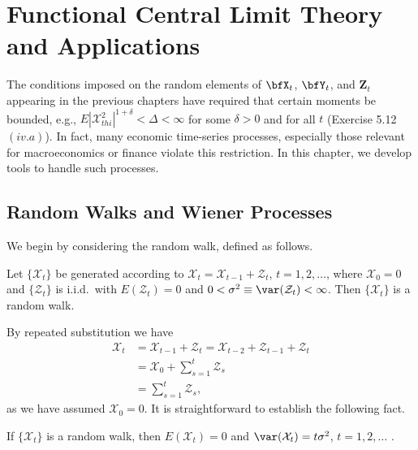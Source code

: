 \chapter{Functional Central Limit Theory and Applications}\label{ch:fclt}

The conditions imposed on the random elements of $\bfX_t$, $\bfY_t$, and $\mathbf{Z}_t$ appearing in the previous chapters have required that certain moments be bounded, e.g., $E|\mathcal{X}_{thi}^2|^{1+\delta} < \Delta < \infty$ for some $\delta > 0$ and for all $t$ (Exercise 5.12 $(iv.a)$). In fact, many economic time-series processes, especially those relevant for macroeconomics or finance violate this restriction. In this chapter, we develop tools to handle such processes.

\section{Random Walks and Wiener Processes}\label{sec:random-walks}

We begin by considering the random walk, defined as follows.

\begin{definition}\label{def:random-walk}
Let $\{\mathcal{X}_t\}$ be generated according to $\mathcal{X}_t = \mathcal{X}_{t-1} + \mathcal{Z}_t$, $t = 1, 2, \ldots$, where $\mathcal{X}_0 = 0$ and $\{\mathcal{Z}_t\}$ is i.i.d.\ with $E(\mathcal{Z}_t) = 0$ and $0 < \sigma^2 \equiv \var(\mathcal{Z}_t) < \infty$. Then $\{\mathcal{X}_t\}$ is a random walk.
\end{definition}

By repeated substitution we have
\begin{align*}
\mathcal{X}_t &= \mathcal{X}_{t-1} + \mathcal{Z}_t = \mathcal{X}_{t-2} + \mathcal{Z}_{t-1} + \mathcal{Z}_t \\
&= \mathcal{X}_0 + \sum_{s=1}^{t} \mathcal{Z}_s \\
&= \sum_{s=1}^{t} \mathcal{Z}_s,
\end{align*}
as we have assumed $\mathcal{X}_0 = 0$. It is straightforward to establish the following fact.

\begin{exercises}
\item\label{ex:7.2} If $\{\mathcal{X}_t\}$ is a random walk, then $E(\mathcal{X}_t) = 0$ and $\var(\mathcal{X}_t) = t\sigma^2$, $t = 1, 2, \ldots$ .
\end{exercises}

